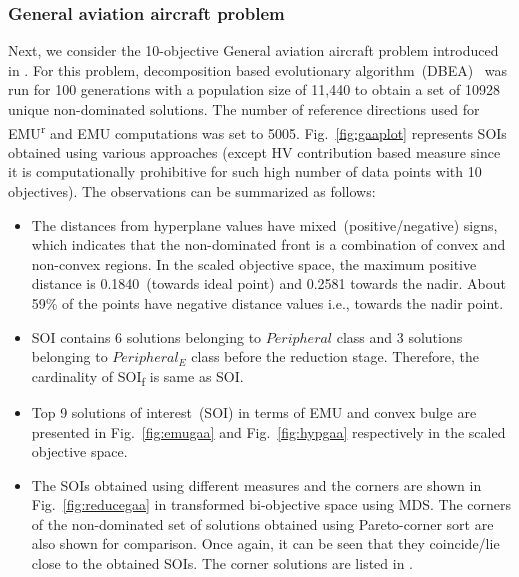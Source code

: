 \subsubsection{General aviation aircraft problem}

Next, we consider the 10-objective General aviation aircraft problem introduced in \cite{Simpson1996}. For this problem, decomposition based evolutionary algorithm~(DBEA)~\cite{asafuddoula2014decomposition} was run for 100 generations with a population size of 11,440 to obtain a set of 10928 unique non-dominated solutions. The number of reference directions used for EMU\textsuperscript{r} and EMU computations was set to 5005. Fig.~\ref{fig:gaaplot} represents SOIs obtained using various approaches (except HV contribution based measure since it is computationally prohibitive for such high number of data points with 10 objectives). The observations can be summarized as follows:

\begin{figure*}[!htb]
	\centering    
	\caption{GAA: (a) EMU\textsuperscript{r}, (b) EMU, (c) Convex Bulge, (d) SOIs}
	\label{fig:gaaplot}
\end{figure*}

\begin{itemize}
	\setlength\itemsep{0em}
	\item The distances from hyperplane values have mixed~(positive/negative) signs, which indicates that the non-dominated front is a combination of convex and non-convex regions. In the scaled objective space, the maximum positive distance is 0.1840~(towards ideal point) and 0.2581 towards the nadir. About 59\% of the points have negative distance values i.e., towards the nadir point. 
	\item SOI contains 6 solutions belonging to $Peripheral$ class and 3 solutions belonging to $Peripheral_E$ class before the reduction stage. Therefore, the cardinality of SOI\textsubscript{f} is same as SOI.
	\item Top 9 solutions of interest~(SOI) in terms of EMU and convex bulge are presented in Fig.~\ref{fig:emugaa} and Fig.~\ref{fig:hypgaa} respectively in the scaled objective space.  
	\item The SOIs obtained using different measures and the corners are shown in Fig.~\ref{fig:reducegaa} in transformed bi-objective space using MDS. The corners of the non-dominated set of solutions obtained using Pareto-corner sort \cite{singh2011corner} are also shown for comparison. Once again, it can be seen that they coincide/lie close to the obtained SOIs. The corner solutions are listed in \cite{benchmark}.   
\end{itemize} 

